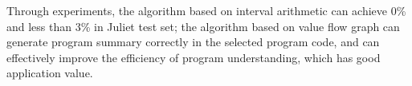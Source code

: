 \begin{abstract*}
Through experiments, the algorithm based on interval arithmetic can achieve 0\% and less than 3\% in Juliet test set; the algorithm based on value flow graph can generate program summary correctly in the selected program code, and can effectively improve the efficiency of program understanding, which has good application value.

\end{abstract*}
